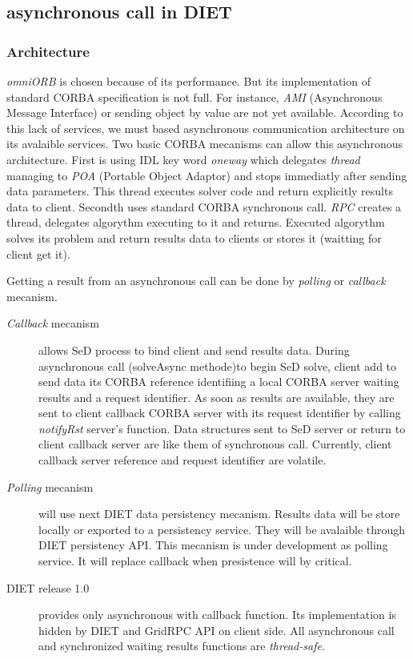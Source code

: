   \subsection{asynchronous call in DIET}

  \subsubsection{Architecture}

  \emph{omniORB} is chosen because of its performance. But its implementation
  of standard CORBA specification is not full. For instance, \emph{AMI} 
  (Asynchronous Message Interface) or sending object by value are not yet 
  available. According to this lack of services, we must based asynchronous 
  communication architecture on its avalaible services.
  Two basic CORBA mecanisms can allow this asynchronous architecture.
  First is using IDL key word \emph{oneway} which delegates \emph{thread} managing
  to \emph{POA} (Portable Object Adaptor) and stops immediatly after sending data parameters. This thread
  executes solver code and return explicitly results data to client.
  Secondth uses standard CORBA synchronous call.
  \emph{RPC} creates a thread, delegates algorythm executing to it and returns.
  Executed algorythm solves its problem and return results data to clients or stores
  it (waitting for client get it).

  Getting a result from an asynchronous call can be done by \emph{polling} or
  \emph{callback} mecanism. 

  \begin{description}
  \item[\emph{Callback} mecanism] allows SeD process to bind client and send results data.
  During asynchronous call (solveAsync methode)to begin SeD solve, client
  add to send data its CORBA reference identifiing a local CORBA server
  waiting results and a request identifier.
  As soon as results are available, they are sent to client callback CORBA server
  with its request identifier by calling \emph{notifyRst} server's function.
  Data structures sent to SeD server or return to client callback server are like
  them of synchronous call. Currently, client callback server reference and request 
  identifier are volatile.
  \item[\emph{Polling} mecanism] will use next DIET data persistency mecanism.
  Results data will be store locally or exported to a persistency service.
  They will be avalaible through DIET persistency API. This mecanism is under 
  development as polling service. It will replace callback when presistence will
  by critical.
  \item[DIET release 1.0] provides only asynchronous with callback function. Its 
  implementation is hidden by DIET and GridRPC API on client side. All asynchronous call
  and synchronized waiting results functions are \emph{thread-safe}.
  \end{description}

